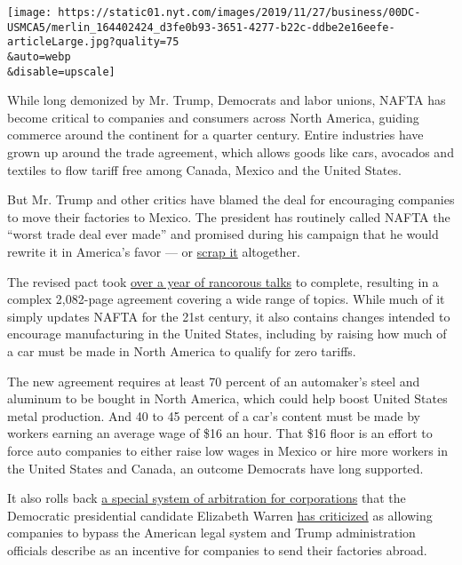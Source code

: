 \texttt{[image: https://static01.nyt.com/images/2019/11/27/business/00DC-USMCA5/merlin\_164402424\_d3fe0b93-3651-4277-b22c-ddbe2e16eefe-articleLarge.jpg?quality=75\\\&auto=webp\\\&disable=upscale]}

While long demonized by Mr. Trump, Democrats and labor unions, NAFTA has
become critical to companies and consumers across North America, guiding
commerce around the continent for a quarter century. Entire industries
have grown up around the trade agreement, which allows goods like cars,
avocados and textiles to flow tariff free among Canada, Mexico and the
United States.

But Mr. Trump and other critics have blamed the deal for encouraging
companies to move their factories to Mexico. The president has routinely
called NAFTA the ``worst trade deal ever made'' and promised during his
campaign that he would rewrite it in America's favor --- or
\href{https://www.nytimes.com/2018/12/02/us/politics/trump-withdraw-nafta.html}{scrap
it} altogether.

The revised pact took
\href{https://www.nytimes.com/2018/09/30/us/politics/us-canada-nafta-deal-deadline.html}{over
a year of rancorous talks} to complete, resulting in a complex
2,082-page agreement covering a wide range of topics. While much of it
simply updates NAFTA for the 21st century, it also contains changes
intended to encourage manufacturing in the United States, including by
raising how much of a car must be made in North America to qualify for
zero tariffs.

The new agreement requires at least 70 percent of an automaker's steel
and aluminum to be bought in North America, which could help boost
United States metal production. And 40 to 45 percent of a car's content
must be made by workers earning an average wage of \$16 an hour. That
\$16 floor is an effort to force auto companies to either raise low
wages in Mexico or hire more workers in the United States and Canada, an
outcome Democrats have long supported.

It also rolls back
\href{https://www.nytimes.com/2017/10/16/us/politics/nafta-united-states-canada.html}{a
special system of arbitration for corporations} that the Democratic
presidential candidate Elizabeth Warren
\href{https://www.warren.senate.gov/newsroom/press-releases/warren-urges-us-trade-rep-to-remove-isds-provisions-during-next-round-of-nafta-negotiations}{has
criticized} as allowing companies to bypass the American legal system
and Trump administration officials describe as an incentive for
companies to send their factories abroad.

